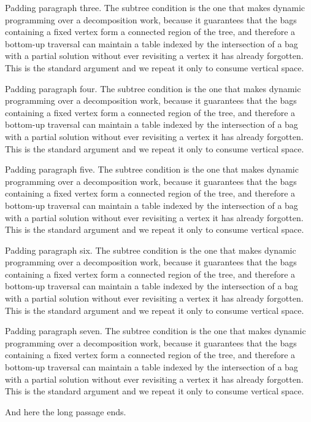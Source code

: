 \documentclass{article}
\theoremstyle{definition}
\begin{document}
Padding paragraph three.  The subtree condition is the one that makes dynamic
programming over a decomposition work, because it guarantees that the bags
containing a fixed vertex form a connected region of the tree, and therefore
a bottom-up traversal can maintain a table indexed by the intersection of a
bag with a partial solution without ever revisiting a vertex it has already
forgotten.  This is the standard argument and we repeat it only to consume
vertical space.

Padding paragraph four.  The subtree condition is the one that makes dynamic
programming over a decomposition work, because it guarantees that the bags
containing a fixed vertex form a connected region of the tree, and therefore
a bottom-up traversal can maintain a table indexed by the intersection of a
bag with a partial solution without ever revisiting a vertex it has already
forgotten.  This is the standard argument and we repeat it only to consume
vertical space.

Padding paragraph five.  The subtree condition is the one that makes dynamic
programming over a decomposition work, because it guarantees that the bags
containing a fixed vertex form a connected region of the tree, and therefore
a bottom-up traversal can maintain a table indexed by the intersection of a
bag with a partial solution without ever revisiting a vertex it has already
forgotten.  This is the standard argument and we repeat it only to consume
vertical space.

Padding paragraph six.  The subtree condition is the one that makes dynamic
programming over a decomposition work, because it guarantees that the bags
containing a fixed vertex form a connected region of the tree, and therefore
a bottom-up traversal can maintain a table indexed by the intersection of a
bag with a partial solution without ever revisiting a vertex it has already
forgotten.  This is the standard argument and we repeat it only to consume
vertical space.

Padding paragraph seven.  The subtree condition is the one that makes dynamic
programming over a decomposition work, because it guarantees that the bags
containing a fixed vertex form a connected region of the tree, and therefore
a bottom-up traversal can maintain a table indexed by the intersection of a
bag with a partial solution without ever revisiting a vertex it has already
forgotten.  This is the standard argument and we repeat it only to consume
vertical space.

And here the long passage ends.
\end{document}
